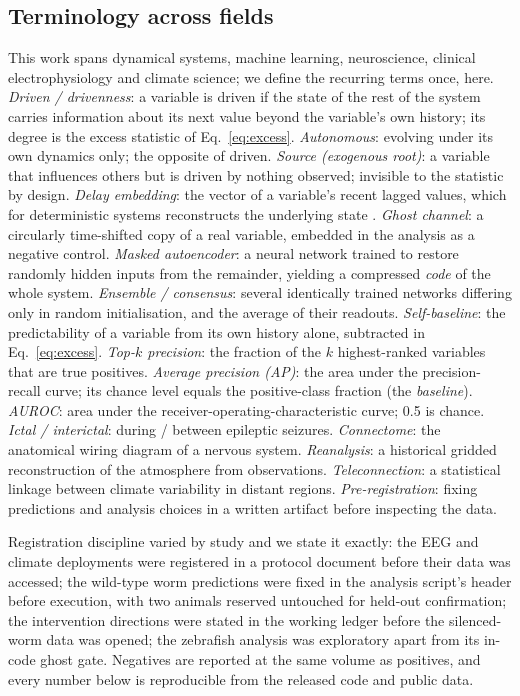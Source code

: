\documentclass[11pt]{article}
\begin{document}
\subsection*{Terminology across fields}
This work spans dynamical systems, machine learning, neuroscience,
clinical electrophysiology and climate science; we define the recurring
terms once, here. \emph{Driven / drivenness}: a variable is driven if the
state of the rest of the system carries information about its next value
beyond the variable's own history; its degree is the excess statistic of
Eq.~\ref{eq:excess}. \emph{Autonomous}: evolving under its own dynamics
only; the opposite of driven. \emph{Source (exogenous root)}: a variable
that influences others but is driven by nothing observed; invisible to the
statistic by design. \emph{Delay embedding}: the vector of a variable's
recent lagged values, which for deterministic systems reconstructs the
underlying state \citep{takens1981}. \emph{Ghost channel}: a circularly
time-shifted copy of a real variable, embedded in the analysis as a
negative control. \emph{Masked autoencoder}: a neural network trained to
restore randomly hidden inputs from the remainder, yielding a compressed
\emph{code} of the whole system. \emph{Ensemble / consensus}: several
identically trained networks differing only in random initialisation, and
the average of their readouts. \emph{Self-baseline}: the predictability of
a variable from its own history alone, subtracted in Eq.~\ref{eq:excess}.
\emph{Top-$k$ precision}: the fraction of the $k$ highest-ranked variables
that are true positives. \emph{Average precision (AP)}: the area under the
precision-recall curve; its chance level equals the positive-class
fraction (the \emph{baseline}). \emph{AUROC}: area under the
receiver-operating-characteristic curve; 0.5 is chance.
\emph{Ictal / interictal}: during / between epileptic seizures.
\emph{Connectome}: the anatomical wiring diagram of a nervous system.
\emph{Reanalysis}: a historical gridded reconstruction of the atmosphere
from observations. \emph{Teleconnection}: a statistical linkage between
climate variability in distant regions. \emph{Pre-registration}: fixing
predictions and analysis choices in a written artifact before inspecting
the data.

Registration discipline varied by study and we state it exactly: the EEG
and climate deployments were registered in a protocol document before their
data was accessed; the wild-type worm predictions were fixed in the analysis
script's header before execution, with two animals reserved untouched for
held-out confirmation; the intervention directions were stated in the
working ledger before the silenced-worm data was opened; the zebrafish
analysis was exploratory apart from its in-code ghost gate. Negatives are
reported at the same volume as positives, and every number below is
reproducible from the released code and public data.
\end{document}
